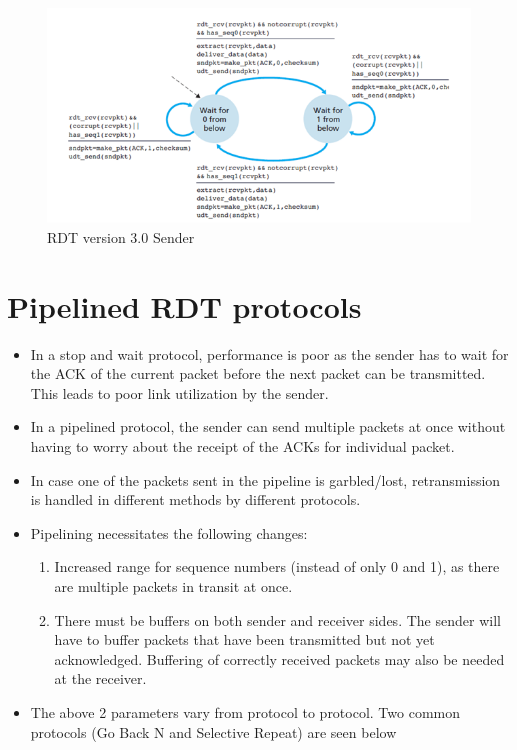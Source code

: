 \documentclass{article}
\theoremstyle{plain}
\theoremstyle{definition}
\begin{document}
\begin{figure}[!h]
    \centering
    \includegraphics[scale=0.8]{rdt22r.png}
    \caption{RDT version 3.0 Sender}
    \label{fig:my_label_10}
\end{figure}

\section{Pipelined RDT protocols}
\begin{itemize}
    \item In a stop and wait protocol, performance is poor as the sender has to wait for the ACK of the current packet before the next packet can be transmitted. This leads to poor link utilization by the sender.
    
    \item In a pipelined protocol, the sender can send multiple packets at once without having to worry about the receipt of the ACKs for individual packet. 
    
    \item In case one of the packets sent in the pipeline is garbled/lost, retransmission is handled in different methods by different protocols. 
    
    \item Pipelining necessitates the following changes:
    \begin{enumerate}
        \item Increased range for sequence numbers (instead of only 0 and 1), as there are multiple packets in transit at once. 
        
        \item There must be buffers on both sender and receiver sides. The sender will have to buffer packets that have been transmitted but not yet acknowledged. Buffering of correctly received packets may also be needed at the receiver.
    \end{enumerate}
    
    \item The above 2 parameters vary from protocol to protocol. Two common protocols (Go Back N and Selective Repeat) are seen below
\end{itemize}
\end{document}
